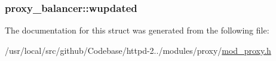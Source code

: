 \subsubsection[{\texorpdfstring{wupdated}{wupdated}}]{ proxy\+\_\+balancer\+::wupdated}\hypertarget{structproxy__balancer_a539fbce3fb0d740a3978b62d77afc4fd}{}\label{structproxy__balancer_a539fbce3fb0d740a3978b62d77afc4fd}


The documentation for this struct was generated from the following file\+:\begin{DoxyCompactItemize}
\item 
/usr/local/src/github/\+Codebase/httpd-\/2../modules/proxy/\hyperlink{mod__proxy_8h}{mod\+\_\+proxy.\+h}\end{DoxyCompactItemize}
